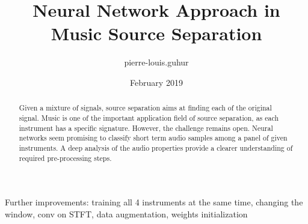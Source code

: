 \documentclass{article}
\title{Neural Network Approach in Music Source Separation}
\author{pierre-louis.guhur }
\date{February 2019}
\begin{document}
\maketitle

\begin{abstract}
    Given a mixture of signals, source separation aims at finding each of the original signal.
    Music is one of the important application field of source separation, as each instrument has a specific signature. 
    However, the challenge remains open. Neural networks seem promising to classify short term audio samples among a panel of given instruments. 
    A deep analysis of the audio properties provide a clearer understanding of required pre-processing steps. 
\end{abstract}






Further improvements: training all 4 instruments at the same time, changing the window, conv on STFT, data augmentation, weights initialization
 
{\small


}
 
\end{document}
